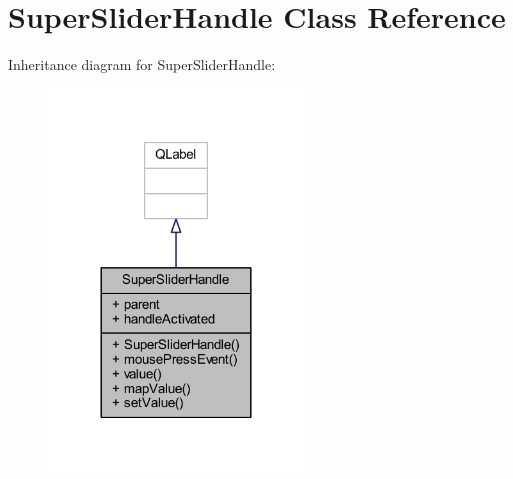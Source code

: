 \hypertarget{class_super_slider_handle}{}\section{Super\+Slider\+Handle Class Reference}
\label{class_super_slider_handle}


Inheritance diagram for Super\+Slider\+Handle\+:
\nopagebreak
\begin{figure}[H]
\begin{center}
\leavevmode
\includegraphics[width=192pt]{class_super_slider_handle__inherit__graph}
\end{center}
\end{figure}


